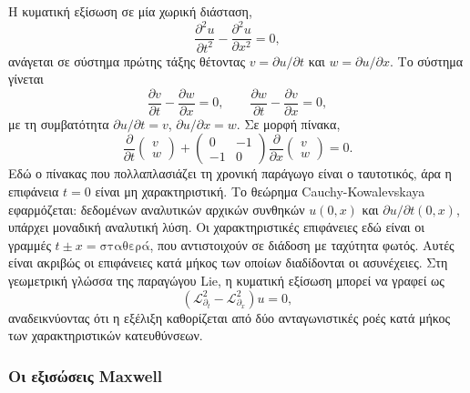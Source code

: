 \documentclass[12pt]{article}
\begin{document}
Η κυματική εξίσωση σε μία χωρική διάσταση,
\begin{equation}
\frac{\partial^2 u}{\partial t^2} - \frac{\partial^2 u}{\partial x^2} = 0,
\end{equation}
ανάγεται σε σύστημα πρώτης τάξης θέτοντας $v = \partial u / \partial t$ και $w = \partial u / \partial x$. Το σύστημα γίνεται
\begin{equation}
\frac{\partial v}{\partial t} - \frac{\partial w}{\partial x} = 0, \qquad \frac{\partial w}{\partial t} - \frac{\partial v}{\partial x} = 0,
\end{equation}
με τη συμβατότητα $\partial u / \partial t = v$, $\partial u / \partial x = w$. Σε μορφή πίνακα,
\begin{equation}
\frac{\partial}{\partial t} \begin{pmatrix} v \\ w \end{pmatrix} + \begin{pmatrix} 0 & -1 \\ -1 & 0 \end{pmatrix} \frac{\partial}{\partial x} \begin{pmatrix} v \\ w \end{pmatrix} = 0.
\end{equation}
Εδώ ο πίνακας που πολλαπλασιάζει τη χρονική παράγωγο είναι ο ταυτοτικός, άρα η επιφάνεια $t = 0$ είναι μη χαρακτηριστική. Το θεώρημα Cauchy-Kowalevskaya εφαρμόζεται: δεδομένων αναλυτικών αρχικών συνθηκών $u(0,x)$ και $\partial u / \partial t (0,x)$, υπάρχει μοναδική αναλυτική λύση. Οι χαρακτηριστικές επιφάνειες εδώ είναι οι γραμμές $t \pm x = \text{σταθερά}$, που αντιστοιχούν σε διάδοση με ταχύτητα φωτός. Αυτές είναι ακριβώς οι επιφάνειες κατά μήκος των οποίων διαδίδονται οι ασυνέχειες. Στη γεωμετρική γλώσσα της παραγώγου Lie, η κυματική εξίσωση μπορεί να γραφεί ως
\begin{equation}
(\mathcal{L}_{\partial_t}^2 - \mathcal{L}_{\partial_x}^2) u = 0,
\end{equation}
αναδεικνύοντας ότι η εξέλιξη καθορίζεται από δύο ανταγωνιστικές ροές κατά μήκος των χαρακτηριστικών κατευθύνσεων.

\subsubsection{Οι εξισώσεις Maxwell}
\end{document}
